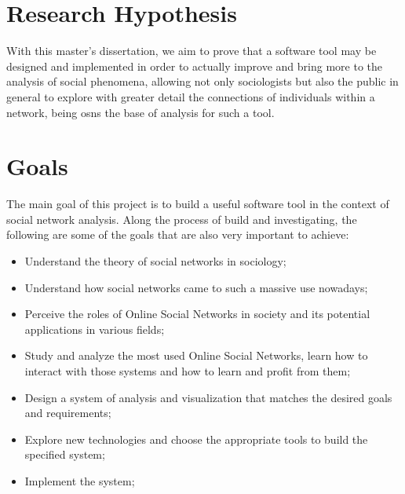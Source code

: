 \section{Research Hypothesis}
With this master's dissertation, we aim to prove that a software tool may be designed and implemented in order to actually improve
and bring more to the analysis of social phenomena, allowing not only sociologists but also the public in general to explore with greater
detail the connections of individuals within a network, being \glspl{osn} the base of analysis for such a tool.

\section{Goals}

The main goal of this project is to build a useful software tool in the context of social network analysis. Along the process of build and investigating, the following are some of the goals that are also very important to achieve:

\begin{itemize}
\item Understand the theory of social networks in sociology;
\item Understand how social networks came to such a massive use nowadays;
\item Perceive the roles of Online Social Networks in society and its potential applications in various fields;
\item Study and analyze the most used Online Social Networks, learn how to interact with those systems and how to learn and profit from them;
\item Design a system of analysis and visualization that matches the desired goals and requirements;
\item Explore new technologies and choose the appropriate tools to build the specified system;
\item Implement the system;
\end{itemize}
